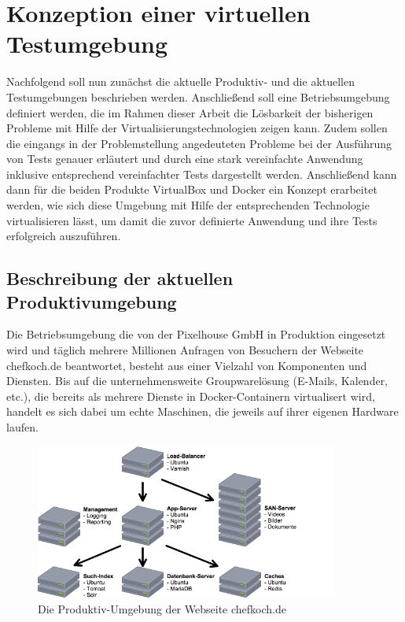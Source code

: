 \section{Konzeption einer virtuellen Testumgebung}

Nachfolgend soll nun zunächst die aktuelle Produktiv- und die aktuellen Testumgebungen beschrieben werden. Anschließend soll eine Betriebsumgebung definiert werden, die im Rahmen dieser Arbeit die Lösbarkeit der bisherigen Probleme mit Hilfe der Virtualisierungstechnologien zeigen kann. Zudem sollen die eingangs in der Problemstellung angedeuteten Probleme bei der Ausführung von Tests genauer erläutert und durch eine stark vereinfachte Anwendung inklusive entsprechend vereinfachter Tests dargestellt werden. Anschließend kann dann für die beiden Produkte VirtualBox und Docker ein Konzept erarbeitet werden, wie sich diese Umgebung mit Hilfe der entsprechenden Technologie virtualisieren lässt, um damit die zuvor definierte Anwendung und ihre Tests erfolgreich auszuführen.

\subsection{Beschreibung der aktuellen Produktivumgebung}

Die Betriebsumgebung die von der Pixelhouse GmbH in Produktion eingesetzt wird und täglich mehrere Millionen Anfragen von Besuchern der Webseite chefkoch.de beantwortet, besteht aus einer Vielzahl von Komponenten und Diensten. Bis auf die unternehmensweite Groupwarelösung (E-Mails, Kalender, etc.), die bereits als mehrere Dienste in Docker-Containern virtualisert wird, handelt es sich dabei um echte Maschinen, die jeweils auf ihrer eigenen Hardware laufen.

\begin{figure}[!ht]
  \begin{center}
    \includegraphics[width=10cm]{bilder/Produktiv-Umgebung.png}
    \caption{Die Produktiv-Umgebung der Webseite chefkoch.de}
  \end{center}
\end{figure}


